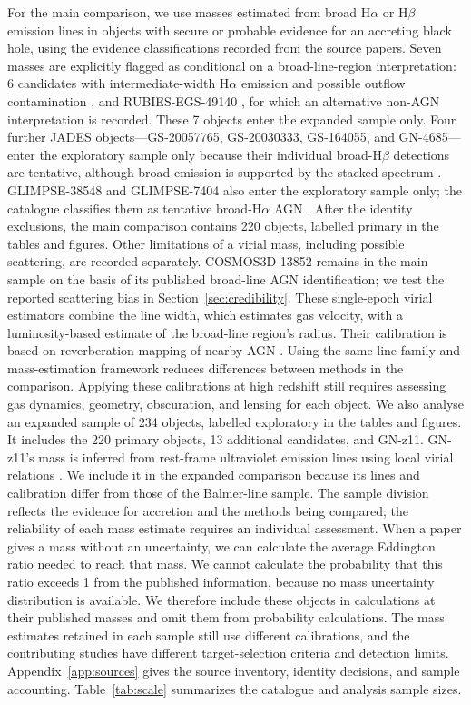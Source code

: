 \documentclass[11pt]{article}
\begin{document}
For the main comparison, we use masses estimated from broad H$\alpha$ or
H$\beta$ emission lines in objects with secure or probable evidence for an
accreting black hole, using the evidence classifications recorded from the
source papers. Seven masses are explicitly flagged as conditional on a
broad-line-region interpretation: 6 candidates with intermediate-width
H$\alpha$ emission and possible outflow contamination \citep{ren2025}, and
RUBIES-EGS-49140 \citep{taylor2025},
for which an alternative non-AGN interpretation is recorded. These 7
objects enter the expanded sample only. Four further JADES objects---GS-20057765,
GS-20030333, GS-164055, and GN-4685---enter the exploratory sample only because
their individual broad-H$\beta$ detections are tentative, although broad emission
is supported by the stacked spectrum \citep{juodzbalis2026}.
GLIMPSE-38548 and GLIMPSE-7404 also enter the exploratory sample only;
the catalogue classifies them as tentative broad-H$\alpha$ AGN \citep{fei2026}.
After the identity exclusions,
the main comparison contains 220 objects, labelled primary in the tables
and figures. Other limitations of a virial mass, including possible scattering,
are recorded separately. COSMOS3D-13852 remains in the main sample on the basis
of its published broad-line AGN identification; we test the reported scattering
bias in Section~\ref{sec:credibility}.
These single-epoch virial estimators combine the line width, which estimates
gas velocity, with a luminosity-based estimate of the broad-line region's radius.
Their calibration is based on reverberation mapping of nearby AGN \citep{shen2013}.
Using the same line family and mass-estimation framework reduces differences
between methods in the comparison. Applying these calibrations at high redshift
still requires assessing gas dynamics, geometry, obscuration, and lensing for
each object.
We also analyse an expanded sample of 234 objects, labelled exploratory in
the tables and figures. It includes the 220 primary objects, 13 additional
candidates, and GN-z11. GN-z11's mass is inferred from rest-frame ultraviolet
emission lines using local virial relations \citep{maiolino2024}. We include
it in the expanded comparison because its lines and calibration differ from
those of the Balmer-line sample. The sample division reflects the evidence
for accretion and the methods being compared; the reliability of each mass
estimate requires an individual assessment.
When a paper gives a mass without an uncertainty, we can calculate the average
Eddington ratio needed to reach that mass. We cannot calculate the probability
that this ratio exceeds 1 from the published information, because no mass
uncertainty distribution is available. We therefore include these objects in
calculations at their published masses and omit them from probability calculations.
The mass estimates retained in each sample still use different calibrations,
and the contributing studies have different target-selection criteria and
detection limits.
Appendix~\ref{app:sources} gives the source inventory,
identity decisions, and sample accounting. Table~\ref{tab:scale} summarizes
the catalogue and analysis sample sizes.
\end{document}
